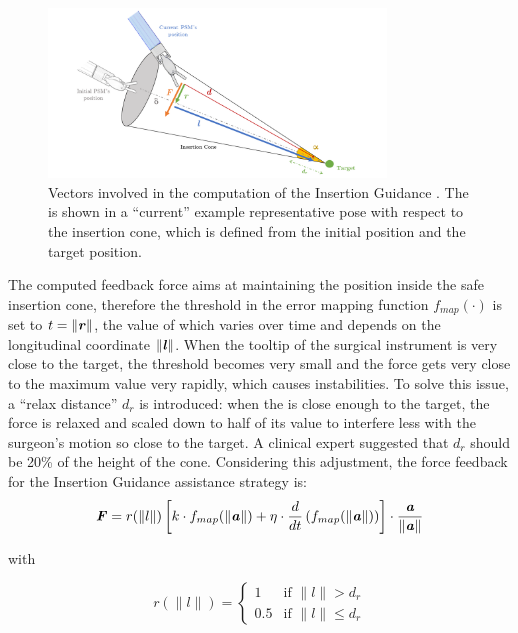\documentclass[../main.tex]{subfiles}
\begin{document}
\begin{figure}
    \centering
    \includegraphics[width=0.8\textwidth]{images/insertion_guidance.png}
    \caption{Vectors involved in the computation of the Insertion Guidance \vf. The \psm is shown in a ``current'' example representative pose with respect to the insertion cone, which is defined from the initial \psm position and the target position.}
    \label{fig:insertionguidance}
\end{figure}

The computed feedback force aims at maintaining the \ee position inside the safe insertion cone, therefore the threshold in the error mapping function $f_{map}(\cdot)$ is set to $t = \|\textbf{\textit{r}}\|$, the value of which varies over time and depends on the longitudinal coordinate $\|\textbf{\textit{l}}\|$. When the tooltip of the surgical instrument is very close to the target, the threshold becomes very small and the force gets very close to the maximum value very rapidly, which causes instabilities. To solve this issue, a ``relax distance'' $d_r$ is introduced: when the \ee is close enough to the target, the force is relaxed and scaled down to half of its value to interfere less with the surgeon's motion so close to the target. A clinical expert suggested that $d_r$ should be 20\% of the height of the cone. Considering this adjustment, the force feedback for the Insertion Guidance assistance strategy is:
\begin{equation}
    \textbf{\textit{F}} = r(\|l\|)\left[k\cdot f_{map}(\|\textbf{\textit{a}}\|) + \eta\cdot \frac{d}{dt} \left( f_{map}(\|\textbf{\textit{a}}\|)\right)\right]\cdot \frac{\textbf{\textit{a}}}{\|\textbf{\textit{a}}\|}
    \label{eq:insertionguidance}
\end{equation}

with

\begin{equation}
    r(\|l\|) = 
    \begin{cases}
        1 & \text{if } \|l\| > d_r \\
        0.5 & \text{if } \|l\| \leq d_r
    \end{cases}
\end{equation}
\end{document}

